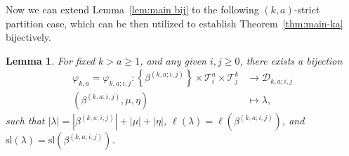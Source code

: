 \documentclass[11pt,reqno]{amsart}
\numberwithin{equation}{section}
\theoremstyle{plain}
\newtheorem{lemma}[theorem]{Lemma}
\theoremstyle{definition}
\newcommand{\set}[1]{\left\{#1\right\}}
\def\sl{\mathrm{sl}}
\def\la{\lambda}
\def\T{\mathcal{T}}
\newcommand{\D}{\mathcal{D}}
\begin{document}
Now we can extend Lemma~\ref{lem:main bij} to the following $(k,a)$-strict partition case, which can be then utilized to establish Theorem~\ref{thm:main-ka} bijectively.

\begin{lemma}\label{lem:amodk bij}
For fixed $k>a\ge 1$, and any given $i, j\geq 0$, there exists a bijection 
\begin{align*}
\varphi_{k, a}=\varphi_{k, a; i, j}: \set{\beta^{(k, a; i, j)}}\times\T^a_i\times\T^k_j &\to \D_{k, a; i, j}\\
(\beta^{(k, a; i, j)},\mu,\eta) &\mapsto \la,
\end{align*}
such that $|\la|=|\beta^{(k, a; i, j)}|+|\mu|+|\eta|$, $\ell(\la)=\ell(\beta^{(k, a; i, j)})$, and $\sl(\la)=\sl(\beta^{(k, a; i, j)})$.
\end{lemma}
\end{document}

